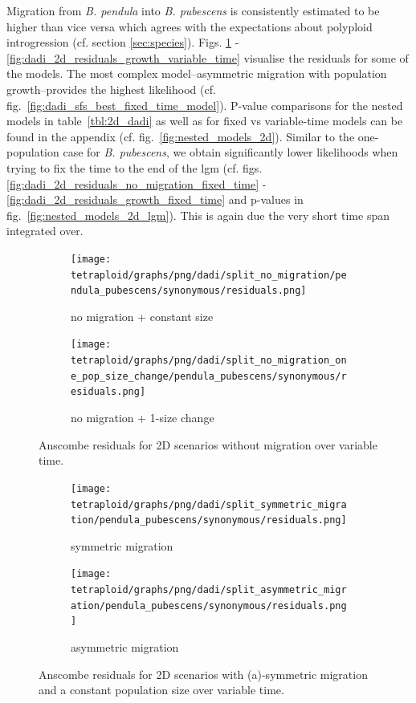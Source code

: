 \documentclass[hidelinks,11pt]{article}
\newcommand{\pendula}{\textit{B. pendula}}
\newcommand{\pubescens}{\textit{B. pubescens}}
\begin{document}
\begin{table}[H]
        \label{tbl:2d_dadi}
    \end{table}

    Migration from \pendula{} into \pubescens{} is consistently estimated to be higher than vice versa which agrees with the expectations about polyploid introgression (cf. section \ref{sec:species}). Figs. \ref{fig:dadi_2d_residuals_constant_size_variable_time} - \ref{fig:dadi_2d_residuals_growth_variable_time} visualise the residuals for some of the models. The most complex model--asymmetric migration with population growth--provides the highest likelihood (cf. fig.~\ref{fig:dadi_sfs_best_fixed_time_model}). P-value comparisons for the nested models in table~\ref{tbl:2d_dadi} as well as for fixed vs variable-time models can be found in the appendix (cf. fig.~\ref{fig:nested_models_2d}). Similar to the one-population case for \pubescens{}, we obtain significantly lower likelihoods when trying to fix the time to the end of the \acrshort{lgm} (cf. figs. \ref{fig:dadi_2d_residuals_no_migration_fixed_time} - \ref{fig:dadi_2d_residuals_growth_fixed_time} and p-values in fig.~\ref{fig:nested_models_2d_lgm}). This is again due the very short time span integrated over.

    \begin{figure}[H]
        \centering
        \begin{subfigure}[b]{0.49\textwidth}
            \texttt{[image: tetraploid/graphs/png/dadi/split\_no\_migration/pendula\_pubescens/synonymous/residuals.png]}
            \caption{no migration + constant size}
        \end{subfigure}
        \hfill
        \begin{subfigure}[b]{0.495\textwidth}
            \texttt{[image: tetraploid/graphs/png/dadi/split\_no\_migration\_one\_pop\_size\_change/pendula\_pubescens/synonymous/residuals.png]}
            \caption{no migration + 1-size change}
        \end{subfigure}
        \caption{Anscombe residuals for 2D scenarios without migration over variable time.}
        \label{fig:dadi_2d_residuals_constant_size_variable_time}
    \end{figure}

    \begin{figure}[H]
        \centering
        \begin{subfigure}[b]{0.49\textwidth}
            \texttt{[image: tetraploid/graphs/png/dadi/split\_symmetric\_migration/pendula\_pubescens/synonymous/residuals.png]}
            \caption{symmetric migration}
        \end{subfigure}
        \hfill
        \begin{subfigure}[b]{0.5\textwidth}
            \texttt{[image: tetraploid/graphs/png/dadi/split\_asymmetric\_migration/pendula\_pubescens/synonymous/residuals.png]}
            \caption{asymmetric migration}
        \end{subfigure}
        \caption{Anscombe residuals for 2D scenarios with (a)-symmetric migration and a constant population size over variable time.}
        \label{fig:dadi_2d_residuals_variable_time}
    \end{figure}
\end{document}
